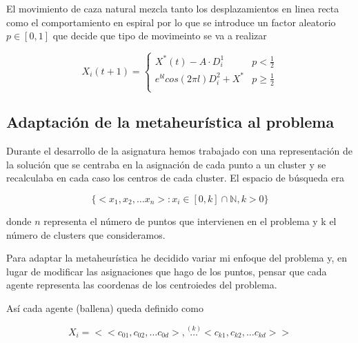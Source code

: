 \documentclass[a4paper,11pt]{article}
\begin{document}
El movimiento de caza natural mezcla tanto los desplazamientos en linea recta
como el comportamiento en espiral por lo que se introduce un factor aleatorio
$p \in [0,1]$ que decide que tipo de movimeinto se va a realizar

\[
    X_i(t+1) =  
\begin{cases}
    X^*(t) - A\cdot D^1_i & p < \frac{1}{2}\\
    e^{bl}cos(2\pi l)D^2_i + X^*  & p\geq \frac{1}{2}\\  
\end{cases}
\]

\subsection{Adaptación de la metaheurística al problema}

Durante el desarrollo de la asignatura hemos trabajado con una representación
de la solución que se centraba en la asignación de cada punto a un cluster
y se recalculaba en cada caso los centros de cada cluster. El espacio de búsqueda 
era 

\[
    \{<x_1, x_2, \dots x_n >: x_i \in [0, k] \cap \mathbb{N}, k > 0\}
\]

donde $n$ representa el número de puntos que intervienen en el problema y k el número 
de clusters que consideramos.

Para adaptar la metaheurística he decidido variar mi enfoque del problema y, en
lugar de modificar las asignaciones que hago de los puntos, pensar que cada
agente representa las coordenas de los centroiedes del problema.

Así cada agente (ballena) queda definido como 

\[
    X_i = <<c_{01},c_{02}, \dots c_{0d}>, \overset{(k)}{\dots} <c_{k1},c_{k2},\dots c_{kd}>>    
\]
\end{document}
